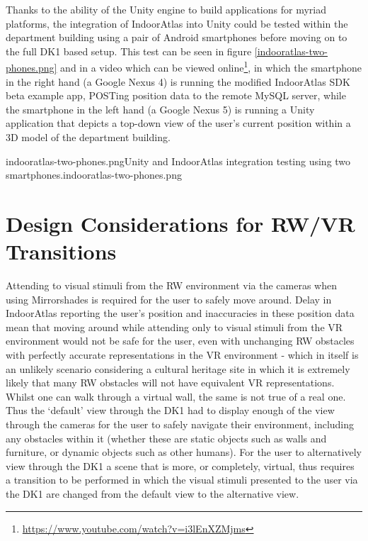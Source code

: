 Thanks to the ability of the Unity engine to build applications for myriad platforms, the integration of IndoorAtlas into Unity could be tested within the department building using a pair of Android smartphones before moving on to the full DK1 based setup. This test can be seen in figure \ref{indooratlas-two-phones.png} and in a video which can be viewed online\footnote{\url{https://www.youtube.com/watch?v=i3lEnXZMjms}}, in which the smartphone in the right hand (a Google Nexus 4) is running the modified IndoorAtlas SDK beta example app, POSTing position data to the remote MySQL server, while the smartphone in the left hand (a Google Nexus 5) is running a Unity application that depicts a top-down view of the user's current position within a 3D model of the department building.

	   {indooratlas-two-phones.png}{Unity and IndoorAtlas integration testing using two smartphones.}{indooratlas-two-phones.png}
       

\section{Design Considerations for RW/VR Transitions}
\label{design-considerations-for-rw-vr-transitions}
Attending to visual stimuli from the RW environment via the cameras when using Mirrorshades is required for the user to safely move around. Delay in IndoorAtlas reporting the user's position and inaccuracies in these position data mean that moving around while attending only to visual stimuli from the VR environment would not be safe for the user, even with unchanging RW obstacles with perfectly accurate representations in the VR environment - which in itself is an unlikely scenario considering a cultural heritage site in which it is extremely likely that many RW obstacles will not have equivalent VR representations. Whilst one can walk through a virtual wall, the same is not true of a real one. Thus the `default' view through the DK1 had to display enough of the view through the cameras for the user to safely navigate their environment, including any obstacles within it (whether these are static objects such as walls and furniture, or dynamic objects such as other humans). For the user to alternatively view through the DK1 a scene that is more, or completely, virtual, thus requires a transition to be performed in which the visual stimuli presented to the user via the DK1 are changed from the default view to the alternative view.

